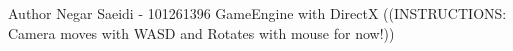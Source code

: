 \begin{DoxyAuthor}{Author}
Negar Saeidi -\/ 101261396 Game\+Engine with DirectX ((INSTRUCTIONS\+: Camera moves with WASD and Rotates with mouse for now!)) 
\end{DoxyAuthor}
